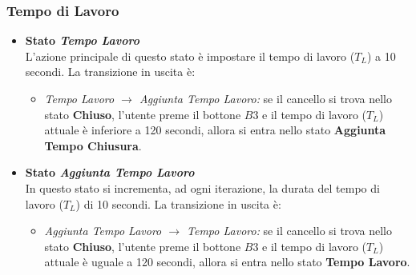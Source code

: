    \subsubsection{Tempo di Lavoro}
        \begin{itemize}
            \item \textbf{Stato \textit{Tempo Lavoro}} \\
                L'azione principale di questo stato è impostare il tempo di lavoro ($T_L$) a 10 secondi.
                \noindent La transizione in uscita è:
                \begin{itemize}
                    \item \textit{Tempo Lavoro $\rightarrow$ Aggiunta Tempo Lavoro:} se il cancello si trova nello stato \textbf{Chiuso}, l'utente preme il bottone $B3$ e il tempo di lavoro ($T_L$) attuale è inferiore a 120 secondi, allora si entra nello stato \textbf{Aggiunta Tempo Chiusura}.
                \end{itemize}

            \item \textbf{Stato \textit{Aggiunta Tempo Lavoro}} \\
                In questo stato si incrementa, ad ogni iterazione, la durata del tempo di lavoro ($T_L$) di 10 secondi.
                \noindent La transizione in uscita è:
                \begin{itemize}
                    \item \textit{Aggiunta Tempo Lavoro $\rightarrow$ Tempo Lavoro:} se il cancello si trova nello stato \textbf{Chiuso}, l'utente preme il bottone $B3$ e il tempo di lavoro ($T_L$) attuale è uguale a 120 secondi, allora si entra nello stato \textbf{Tempo Lavoro}.
                \end{itemize}
        \end{itemize}